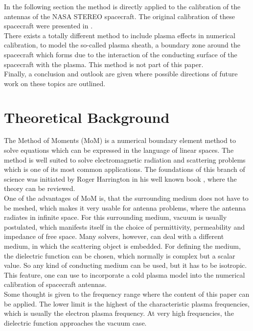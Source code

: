 \documentclass[two-coloumn,ras]{agutex}
\begin{document}
\begin{article}
In the following section the method is directly applied to the calibration of the antennas of the NASA STEREO spacecraft. The original calibration of these spacecraft were presented in \cite{ossi09}.\\

There exists a totally different method to include plasma effects in numerical calibration, to model the so-called plasma sheath, a boundary zone around the spacecraft which forms due to the interaction of the conducting surface of the spacecraft with the plasma. This method is not part of this paper.\\

Finally, a conclusion and outlook are given where possible directions of future work on these topics are outlined.

\section{Theoretical Background}
The Method of Moments (MoM) is a numerical boundary element method to solve equations which can be expressed in the language of linear spaces. The method is well suited to solve electromagnetic radiation and scattering problems which is one of its most common applications. The foundations of this branch of science was initiated by Roger Harrington in his well known book \cite{harrington}, where the theory can be reviewed.\\

One of the advantages of MoM is, that the surrounding medium does not have to be meshed, which makes it very usable for antenna problems, where the antenna radiates in infinite space. For this surrounding medium, vacuum is usually postulated, which manifests itself in the choice of permittivity, permeability and impedance of free space. Many solvers, however, can deal with a different medium, in which the scattering object is embedded. For defining the medium, the dielectric function can be chosen, which normally is complex but a scalar value. So any kind of conducting medium can be used, but it has to be isotropic. This feature, one can use to incorporate a cold plasma model into the numerical calibration of spacecraft antennas.\\

Some thought is given to the frequency range where the content of this paper can be applied. The lower limit is the highest of the characteristic plasma frequencies, which is usually the electron plasma frequency. At very high frequencies, the dielectric function approaches the vacuum case.\\


\end{article}
\end{document}
